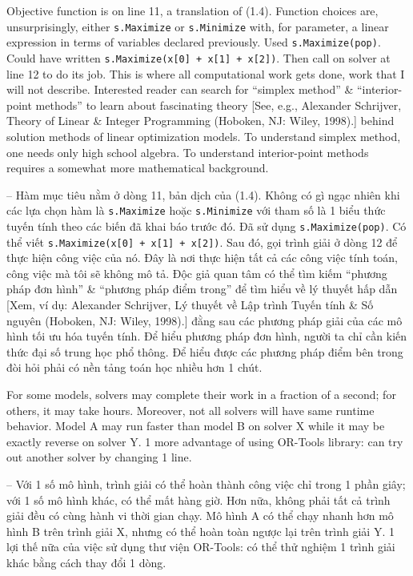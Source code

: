 \documentclass{article}
\begin{document}
\begin{itemize}
\begin{itemize}
        Objective function is on line 11, a translation of (1.4). Function choices are, unsurprisingly, either {\tt s.Maximize} or {\tt s.Minimize} with, for parameter, a linear expression in terms of variables declared previously. Used {\tt s.Maximize(pop)}. Could have written {\tt s.Maximize(x[0] + x[1] + x[2])}. Then call on solver at line 12 to do its job. This is where all computational work gets done, work that I will not describe. Interested reader can search for ``simplex method'' \& ``interior-point methods'' to learn about fascinating theory [See, e.g., {\sc Alexander Schrijver}, Theory of Linear \& Integer Programming (Hoboken, NJ: Wiley, 1998).] behind solution methods of linear optimization models. To understand simplex method, one needs only high school algebra. To understand interior-point methods requires a somewhat more mathematical background.

        -- Hàm mục tiêu nằm ở dòng 11, bản dịch của (1.4). Không có gì ngạc nhiên khi các lựa chọn hàm là {\tt s.Maximize} hoặc {\tt s.Minimize} với tham số là 1 biểu thức tuyến tính theo các biến đã khai báo trước đó. Đã sử dụng {\tt s.Maximize(pop)}. Có thể viết {\tt s.Maximize(x[0] + x[1] + x[2])}. Sau đó, gọi trình giải ở dòng 12 để thực hiện công việc của nó. Đây là nơi thực hiện tất cả các công việc tính toán, công việc mà tôi sẽ không mô tả. Độc giả quan tâm có thể tìm kiếm ``phương pháp đơn hình'' \& ``phương pháp điểm trong'' để tìm hiểu về lý thuyết hấp dẫn [Xem, ví dụ: {\sc Alexander Schrijver}, Lý thuyết về Lập trình Tuyến tính \& Số nguyên (Hoboken, NJ: Wiley, 1998).] đằng sau các phương pháp giải của các mô hình tối ưu hóa tuyến tính. Để hiểu phương pháp đơn hình, người ta chỉ cần kiến thức đại số trung học phổ thông. Để hiểu được các phương pháp điểm bên trong đòi hỏi phải có nền tảng toán học nhiều hơn 1 chút.

        For some models, solvers may complete their work in a fraction of a second; for others, it may take hours. Moreover, not all solvers will have same runtime behavior. Model A may run faster than model B on solver X while it may be exactly reverse on solver Y. 1 more advantage of using OR-Tools library: can try out another solver by changing 1 line.

        -- Với 1 số mô hình, trình giải có thể hoàn thành công việc chỉ trong 1 phần giây; với 1 số mô hình khác, có thể mất hàng giờ. Hơn nữa, không phải tất cả trình giải đều có cùng hành vi thời gian chạy. Mô hình A có thể chạy nhanh hơn mô hình B trên trình giải X, nhưng có thể hoàn toàn ngược lại trên trình giải Y. 1 lợi thế nữa của việc sử dụng thư viện OR-Tools: có thể thử nghiệm 1 trình giải khác bằng cách thay đổi 1 dòng.


\end{itemize}
\end{itemize}
\end{document}

